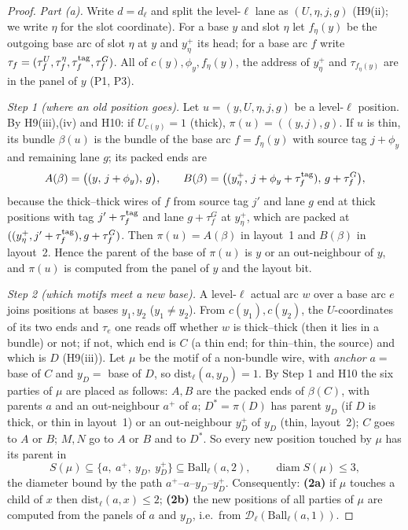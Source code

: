 \documentclass[11pt]{article}
\theoremstyle{definition}
\theoremstyle{remark}
\newcommand{\Ball}{\mathrm{Ball}}
\begin{document}
\begin{proof}
\emph{Part (a).} Write $d=d_\ell$ and split the level-$\ell$ lane as $(U,\eta,j,g)$ (H9(ii); we write $\eta$ for the slot
coordinate). For a base $y$ and slot $\eta$ let $f_\eta(y)$ be the outgoing base arc of slot $\eta$ at $y$ and $y^+_\eta$ its head;
for a base arc $f$ write $\tau_f=(\tau_f^U,\tau_f^\eta,\tau_f^{\rm tag},\tau_f^G)$. All of $c(y),\phi_y,f_\eta(y)$, the address of
$y^+_\eta$ and $\tau_{f_\eta(y)}$ are in the panel of $y$ (P1, P3).

\emph{Step 1 (where an old position goes).} Let $u=(y,U,\eta,j,g)$ be a level-$\ell$ position. By H9(iii),(iv) and H10:
if $U_{c(y)}=1$ (thick), $\pi(u)=((y,j),g)$. If $u$ is thin, its bundle $\beta(u)$ is the bundle of the base arc
$f=f_\eta(y)$ with source tag $j+\phi_y$ and remaining lane $g$; its packed ends are
\[
 A(\beta)=\bigl((y,\,j+\phi_y),\,g\bigr),\qquad B(\beta)=\bigl((y^+_\eta,\,j+\phi_y+\tau_f^{\rm tag}),\,g+\tau_f^G\bigr),
\]
because the thick--thick wires of $f$ from source tag $j'$ and lane $g$ end at thick positions with tag $j'+\tau_f^{\rm tag}$ and
lane $g+\tau_f^G$ at $y^+_\eta$, which are packed at $((y^+_\eta,j'+\tau^{\rm tag}_f),g+\tau_f^G)$. Then $\pi(u)=A(\beta)$ in
layout~1 and $B(\beta)$ in layout~2. Hence the parent of the base of $\pi(u)$ is $y$ or an out-neighbour of $y$, and $\pi(u)$ is
computed from the panel of $y$ and the layout bit.

\emph{Step 2 (which motifs meet a new base).} A level-$\ell$ actual arc $w$ over a base arc $e$ joins positions at bases $y_1,y_2$
($y_1\ne y_2$). From $c(y_1),c(y_2)$, the $U$-coordinates of its two ends and $\tau_e$ one reads off whether $w$ is thick--thick
(then it lies in a bundle) or not; if not, which end is $C$ (a thin end; for thin--thin, the source) and which is $D$ (H9(iii)).
Let $\mu$ be the motif of a non-bundle wire, with \emph{anchor} $a=$ base of $C$ and $y_D=$ base of $D$, so
$\mathrm{dist}_\ell(a,y_D)=1$. By Step 1 and H10 the six parties of $\mu$ are placed as follows: $A,B$ are the packed ends of
$\beta(C)$, with parents $a$ and an out-neighbour $a^+$ of $a$; $D^*=\pi(D)$ has parent $y_D$ (if $D$ is thick, or thin in
layout~1) or an out-neighbour $y_D^+$ of $y_D$ (thin, layout~2); $C$ goes to $A$ or $B$; $M,N$ go to $A$ or $B$ and to $D^*$.
So every new position touched by $\mu$ has its parent in
\[
 S(\mu)\subseteq\{a,\ a^+,\ y_D,\ y_D^+\}\subseteq\Ball_\ell(a,2),\qquad \operatorname{diam}S(\mu)\le3,
\]
the diameter bound by the path $a^+$--$a$--$y_D$--$y_D^+$. Consequently: \textbf{(2a)} if $\mu$ touches a child of $x$ then
$\mathrm{dist}_\ell(a,x)\le2$; \textbf{(2b)} the new positions of all parties of $\mu$ are computed from the panels of $a$ and
$y_D$, i.e.\ from $\mathcal D_\ell(\Ball_\ell(a,1))$.


\end{proof}
\end{document}
